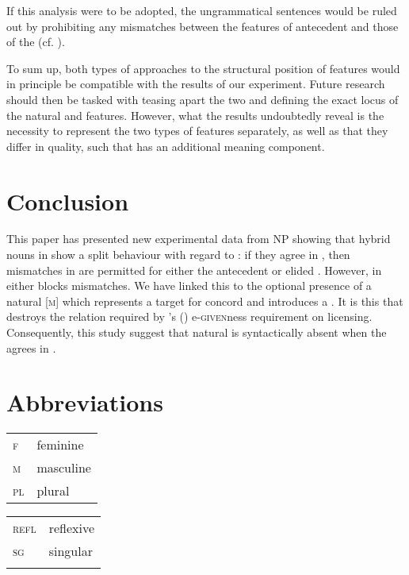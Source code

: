 \documentclass[output=paper,modfonts,newtxmath,hidelinks]{langscibook}
\begin{document}
\noindent If this analysis were to be adopted, the ungrammatical sentences would be ruled out by prohibiting  any mismatches between the features of antecedent and those of the  (cf. \citealt{merchant13}). 
			
			To sum up, both types of approaches to the structural position of  features would in principle be compatible with the results of our experiment. Future research should then be tasked with teasing apart the two and defining the exact locus of the natural and  features. However, what the results undoubtedly reveal is the necessity to represent the two types of features separately, as well as that they differ in quality, such that  has an additional meaning component.   
			
			
			\section{Conclusion}	
			
			This paper has presented new experimental data from  NP  showing that hybrid nouns in  show a split behaviour with regard to  : if they agree in  , then mismatches in   are permitted for either the antecedent or elided . However,   in either  blocks  mismatches. We have linked this to the optional presence of a natural [\textsc{m}]  which represents a target for  concord and introduces a  .
			It is this   that destroys the  relation required by \citeauthor{merchant2001}'s (\citeyear{merchant2001}) e-\textsc{given}ness requirement on  licensing.
			Consequently,  this study suggest that natural   is syntactically absent when the  agrees in .
		
		
    
    
\section*{Abbreviations}

\begin{tabularx}{.5\textwidth}{@{}lQ@{}}
\textsc{f}&{feminine}\\
\textsc{m}&{masculine}\\
\textsc{pl}&{plural}\\
\end{tabularx}%
\begin{tabularx}{.5\textwidth}{@{}lQ@{}}
\textsc{refl}&reflexive\\
\textsc{sg}&singular\\
&\\
\end{tabularx}
\end{document}
